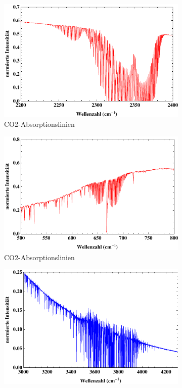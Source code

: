 \documentclass[paper=a4,fontsize=10pt,DIV=18,twocolumn,parskip=half]{scrartcl}
\numberwithin{equation}{section}    %
\begin{document}
\begin{figure}
    \centering
    \begin{subfigure}{\columnwidth}
        \includegraphics[width=\textwidth]{Bilder/Luft2}
        \caption{CO2-Absorptionslinien}
        \label{Luft2}
    \end{subfigure}
    \begin{subfigure}{\columnwidth}
        \includegraphics[width=\textwidth]{Bilder/Luft3}
        \caption{CO2-Absorptionslinien}
        \label{Luft3}
    \end{subfigure}
    \begin{subfigure}{\columnwidth}
        \includegraphics[width=\textwidth]{Bilder/Luft4}

\end{subfigure}
\end{figure}
\end{document}

